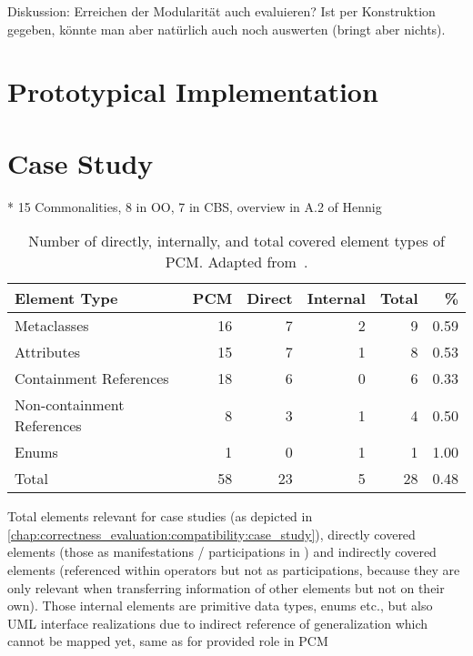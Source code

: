 
Diskussion: Erreichen der Modularität auch evaluieren? Ist per Konstruktion gegeben, könnte man aber natürlich auch noch auswerten (bringt aber nichts).


\section{Prototypical Implementation}

\section{Case Study}

* 15 Commonalities, 8 in OO, 7 in CBS, overview in A.2 of Hennig
\begin{table}[htb]
	\centering
		\begin{tabular}{lrrrrr}
			\toprule
			\multicolumn{1}{l}{\bfseries Element Type} & \multicolumn{1}{r}{\bfseries PCM} & \multicolumn{1}{r}{\bfseries Direct} & \multicolumn{1}{r}{\bfseries Internal} & \multicolumn{1}{r}{\bfseries Total} & \multicolumn{1}{r}{\bfseries \%}\\
			\midrule
			Metaclasses 				& 16 & 7  & 2 		& 9 & 0.59  \\
			Attributes 					& 15 & 7  & 1 		& 8 & 0.53 \\
			Containment References 		& 18 & 6  & 0 		& 6 & 0.33  \\
			Non-containment References 	& 8  & 3  & 1  		& 4 & 0.50  \\
			Enums 						& 1  & 0  & 1  		& 1 & 1.00  \\
			\midrule
			Total 						& 58  & 23  & 5  	& 28 & 0.48  \\
			\bottomrule
		\end{tabular}
	\caption{Number of directly, internally, and total covered element types of PCM. Adapted from~\cite[Table 10.3]{hennig2020ma}.}
	\label{tab:commonalities_evaluation:coverage_pcm}
\end{table}

Total elements relevant for case studies (as depicted in \autoref{chap:correctness_evaluation:compatibility:case_study}), directly covered elements (those as manifestations / participations in \commonalities) and indirectly covered elements (referenced within operators but not as participations, because they are only relevant when transferring information of other elements but not on their own).
Those internal elements are primitive data types, enums etc., but also UML interface realizations due to indirect reference of generalization which cannot be mapped yet, same as for provided role in PCM

